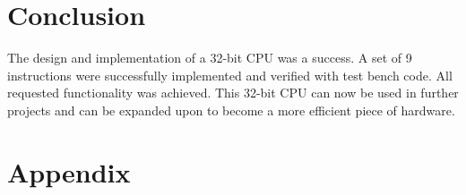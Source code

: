 \documentclass[12pt]{article}
\begin{document}
\section{Conclusion}
The design and implementation of a 32-bit CPU was a success. A set of 9 instructions were successfully implemented and verified with test bench code. All requested functionality was achieved. This 32-bit CPU can now be used in further projects and can be expanded upon to become a more efficient piece of hardware.
\newpage
\section*{Appendix}

\label{code:tbCode}
\end{document}
